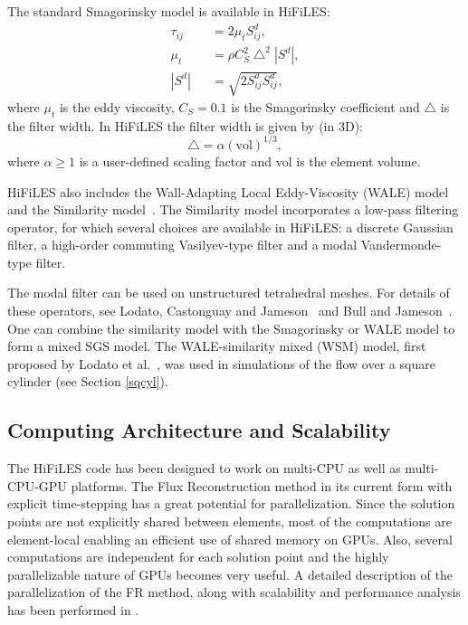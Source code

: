 The standard Smagorinsky model\cite{smagorinsky1963} is available in HiFiLES:
\begin{eqnarray}\label{smag}
\tau_{ij} &&= 2 \mu_t S^d_{ij}, \\
\mu_t &&= \rho C_S^2 \bigtriangleup^2 | S^d |,\\
| S^d | &&= \sqrt{2 S^d_{ij} S^d_{ij}},
\end{eqnarray}
where $\mu_t$ is the eddy viscosity, $C_S = 0.1$ is the Smagorinsky coefficient and $\bigtriangleup$ is the filter width. In HiFiLES the filter width is given by (in 3D):
\begin{equation}
\bigtriangleup = \alpha (\text{vol})^{1/3},
\end{equation}
where $\alpha \geq 1$ is a user-defined scaling factor and vol is the element volume.

HiFiLES also includes the Wall-Adapting Local Eddy-Viscosity (WALE) model~\cite{nicoud1999} and the Similarity model~\cite{bardina1980}.
The Similarity model incorporates a low-pass filtering operator, for which several choices are available in HiFiLES: a discrete Gaussian filter\cite{lodato2012b}, a high-order commuting Vasilyev-type filter\cite{vasilyev1998,vasilyev2001} and a modal Vandermonde-type filter\cite{blackburn2003}.

The modal filter can be used on unstructured tetrahedral meshes. For details of these operators, see Lodato, Castonguay and Jameson~\cite{lodato2012b} and Bull and Jameson~\cite{bull2014a}. One can combine the similarity model with the Smagorinsky or WALE model to form a mixed SGS model. The WALE-similarity mixed (WSM) model, first proposed by Lodato et al.~\cite{lodato2009}, was used in simulations of the flow over a square cylinder (see Section \ref{sqcyl}).

\subsection{Computing Architecture and Scalability}

The HiFiLES code has been designed to work on multi-CPU as well as multi-CPU-GPU platforms. The Flux Reconstruction method in its current form with explicit time-stepping has a great potential for parallelization. Since the solution points are not explicitly shared between elements, most of the computations are element-local enabling an efficient use of shared memory on GPUs. Also, several computations are independent for each solution point and the highly parallelizable nature of GPUs becomes very useful. A detailed description of the parallelization of the FR method, along with scalability and performance analysis has been performed in \cite{castonguay2011}.
